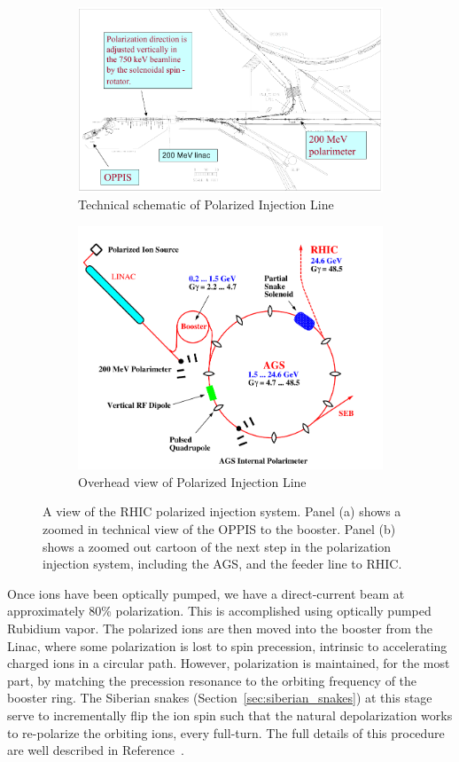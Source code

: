 \begin{figure}
  \centering
  \begin{subfigure}[b]{\textwidth}
    \centering
    \includegraphics[width=0.7\linewidth]{./figures/rhic_polarized_injector.png}
		\caption{
			Technical schematic of Polarized Injection Line \cite{Zelenski2007}
		}
    \label{fig:polarized_top_view_1} 
  \end{subfigure}
  \begin{subfigure}[b]{\textwidth}
    \centering
    \includegraphics[width=0.7\linewidth]{./figures/polarized_beam_rhic_complex.png}
		\caption{
			Overhead view of Polarized Injection Line \cite{RHIC2006}
		}
    \label{fig:polarized_top_view_2}
  \end{subfigure}
  \caption{
    A view of the RHIC polarized injection system. Panel (a) shows a zoomed in
    technical view of the OPPIS to the booster. Panel (b) shows a zoomed out
    cartoon of the next step in the polarization injection system, including
    the AGS, and the feeder line to RHIC.
  }
  \label{fig:rhic_polarized_beam_line}
\end{figure}

Once ions have been optically pumped, we have a direct-current beam at
approximately 80\% polarization. This is accomplished using optically pumped
Rubidium vapor. The polarized ions are then moved into the booster from the
Linac, where some polarization is lost to spin precession, intrinsic to
accelerating charged ions in a circular path.  However, polarization is
maintained, for the most part, by matching the precession resonance to the
orbiting frequency of the booster ring.  The Siberian snakes
(Section~\ref{sec:siberian_snakes}) at this stage serve to incrementally flip
the ion spin such that the natural depolarization works to re-polarize the
orbiting ions, every full-turn. The full details of this procedure are well
described in Reference~\cite{RHIC2006}.

